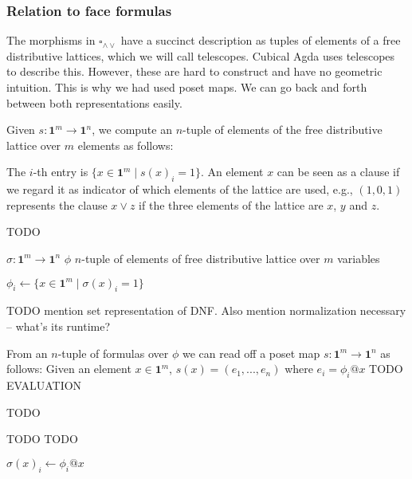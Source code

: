 \documentclass[11pt]{article}
\theoremstyle{definition}
\newcommand{\join}{\wedge}
\newcommand{\meet}{\vee}
\newcommand{\dedekind}{\square_{\join \meet}}
\newcommand{\pint}[1]{\mathbf{1}^{#1}}
\begin{document}
\subsubsection{Relation to face formulas}

The morphisms in $\dedekind$ have a succinct description as tuples of elements of a free
distributive lattices, which we will call telescopes.
Cubical Agda uses telescopes to describe this. However, these are hard to
construct and have no geometric intuition. This is why we had used poset maps.
We can go back and forth between both representations easily.


Given $s : \pint{m} \to \pint{n}$, we compute an $n$-tuple of elements of the
free distributive lattice over $m$ elements as follows:

The $i$-th entry is $\{ x \in \pint{m} \mid s(x)_i = 1 \}$. An element $x$ can be
seen as a clause if we regard it as indicator of which elements of the lattice
are used, e.g., $(1,0,1)$ represents the clause $x \meet z$ if the three
elements of the lattice are $x$, $y$ and $z$.

\begin{algorithm}[H]
  \caption{TODO}\label{alg:subst2tele}
  \begin{algorithmic}
    \Require $\sigma : \pint{m} \to \pint{n}$
    \Ensure $\phi$ $n$-tuple of elements of free distributive lattice over $m$ variables

      \State $\phi_i \gets \{ x \in \pint{m} \mid \sigma(x)_i = 1 \}$
      \Comment{$\mathcal{O}(2^m)$ many elements in $\pint{m}$}
    \EndFor
    \State {}
    \EndProcedure
  \end{algorithmic}
\end{algorithm}

TODO mention set representation of DNF. Also mention normalization necessary --
what's its runtime?

From an $n$-tuple of formulas over $\phi$ we can read off a poset map $s :
\pint{m} \to \pint{n}$ as follows: Given an element $x \in \pint{m}$, $s(x) = (e_1
, ... , e_n) $ where $e_i = \phi_i @ x$ TODO EVALUATION

\begin{algorithm}[H]
  \caption{TODO}\label{alg:teletosubst}
  \begin{algorithmic}
    \Require TODO
    \Ensure TODO

    \For{$x \gets \pint{m}$} 
        \State $\sigma(x)_i \gets \phi_i @ x$
      \EndFor
    \EndFor
    \State \Return{$\sigma$}
    \EndProcedure
  \end{algorithmic}
\end{algorithm}
\end{document}
